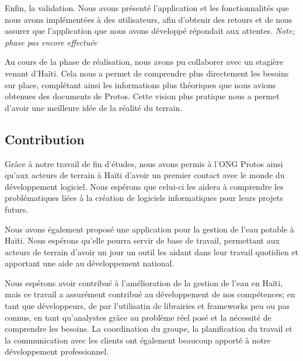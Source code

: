\documentclass{eplmastersthesis_FR}
\begin{document}
			Enfin, la validation. Nous avons présenté l'application et les fonctionnalités que nous avons implémentées à des utilisateurs, afin d'obtenir des retours et de nous assurer que l'application que nous avons développé répondait aux attentes. \emph{Note; phase pas encore effectuée}

			Au cours de la phase de réalisation, nous avons pu collaborer avec un stagière venant d'Haïti. Cela nous a permet de comprendre plus directement les besoins sur place, complétant ainsi les informations plus théoriques que nous avions obtenues des documents de Protos. Cette vision plus pratique nous a permet d'avoir une meilleure idée de la réalité du terrain.


		\subsection*{Contribution}

			Grâce à notre travail de fin d'études, nous avons permis à l'ONG Protos ainsi qu'aux acteurs de terrain à Haïti d'avoir un premier contact avec le monde du développement logiciel. Nous espérons que celui-ci les aidera à comprendre les problématiques liées à la création de logiciels informatiques pour leurs projets futurs.

			Nous avons également proposé une application pour la gestion de l'eau potable à Haïti. Nous espérons qu'elle pourra servir de base de travail, permettant aux acteurs de terrain d'avoir un jour un outil les aidant dans leur travail quotidien et apportant une aide au développement national.

			Nous espérons avoir contribué à l'amélioration de la gestion de l'eau en Haïti, mais ce travail a assurément contribué au développement de nos compétences; en tant que développeurs, de par l'utilisatin de librairies et frameworks peu ou pas connus, en tant qu'analystes grâce au problème réel posé et la nécessité de comprendre les besoins. La coordination du groupe, la planification du travail et la communication avec les clients ont également beaucoup apporté à notre développement professionnel.
\end{document}
